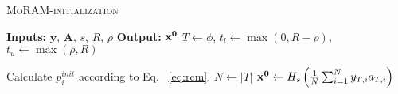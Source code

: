 \begin{algorithm}[t]
	\caption{\textsc{MoRAM-initialization}}
	\label{alg:RCM}
	\begin{algorithmic}
		\State\textbf{Inputs:} $\mathbf{y}$, $\mathbf{A}$, $s$, $R$, $\rho$
		\State\textbf{Output:}  $\mathbf{x^0}$
		\State $T \leftarrow \phi$, $t_l \leftarrow \max(0, R-\rho)$, $t_u \leftarrow \max(\rho, R)$
%		
		
		\EndIf
		\State Calculate $p^{init}_i$ according to Eq. ~\ref{eq:rcm}.
		\EndFor
		\State $N \leftarrow |T|$
		\State $\mathbf{x^0} \leftarrow H_s\left( \frac{1}{N}\sum_{i=1}^{N}y_{T,i}a_{T,i}\right)$
	\end{algorithmic}
\end{algorithm}




